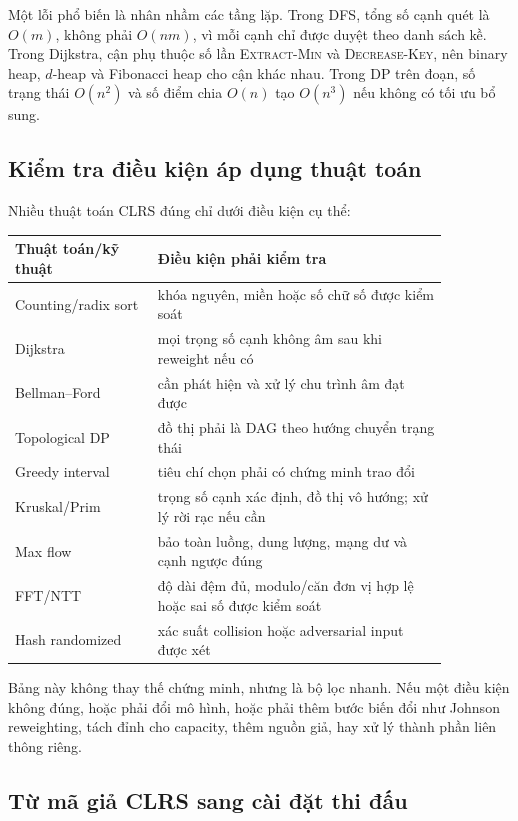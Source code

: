 \documentclass[11pt]{article}
\begin{document}
Một lỗi phổ biến là nhân nhầm các tầng lặp. Trong DFS, tổng số cạnh quét là
\(O(m)\), không phải \(O(nm)\), vì mỗi cạnh chỉ được duyệt theo danh sách kề.
Trong Dijkstra, cận phụ thuộc số lần \textsc{Extract-Min} và
\textsc{Decrease-Key}, nên binary heap, \(d\)-heap và Fibonacci heap cho cận
khác nhau. Trong DP trên đoạn, số trạng thái \(O(n^2)\) và số điểm chia
\(O(n)\) tạo \(O(n^3)\) nếu không có tối ưu bổ sung.

\subsection{Kiểm tra điều kiện áp dụng thuật toán}

Nhiều thuật toán CLRS đúng chỉ dưới điều kiện cụ thể:
\begin{center}
\begin{tabular}{p{0.28\linewidth}p{0.58\linewidth}}
\textbf{Thuật toán/kỹ thuật} & \textbf{Điều kiện phải kiểm tra} \\
\hline
Counting/radix sort & khóa nguyên, miền hoặc số chữ số được kiểm soát \\
Dijkstra & mọi trọng số cạnh không âm sau khi reweight nếu có \\
Bellman--Ford & cần phát hiện và xử lý chu trình âm đạt được \\
Topological DP & đồ thị phải là DAG theo hướng chuyển trạng thái \\
Greedy interval & tiêu chí chọn phải có chứng minh trao đổi \\
Kruskal/Prim & trọng số cạnh xác định, đồ thị vô hướng; xử lý rời rạc nếu cần \\
Max flow & bảo toàn luồng, dung lượng, mạng dư và cạnh ngược đúng \\
FFT/NTT & độ dài đệm đủ, modulo/căn đơn vị hợp lệ hoặc sai số được kiểm soát \\
Hash randomized & xác suất collision hoặc adversarial input được xét \\
\end{tabular}
\end{center}

Bảng này không thay thế chứng minh, nhưng là bộ lọc nhanh. Nếu một điều kiện
không đúng, hoặc phải đổi mô hình, hoặc phải thêm bước biến đổi như Johnson
reweighting, tách đỉnh cho capacity, thêm nguồn giả, hay xử lý thành phần liên
thông riêng.

\subsection{Từ mã giả CLRS sang cài đặt thi đấu}
\end{document}
